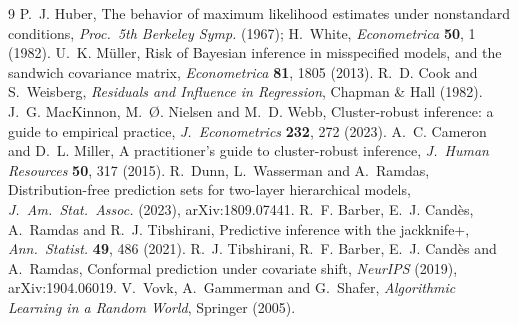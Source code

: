 \documentclass[11pt,a4paper]{article}
\begin{document}
\begin{thebibliography}{9}
 P.~J. Huber, The behavior of maximum likelihood estimates under nonstandard
conditions, \emph{Proc.\ 5th Berkeley Symp.} (1967); H.~White, \emph{Econometrica} \textbf{50}, 1 (1982).
 U.~K. M\"uller, Risk of Bayesian inference in misspecified models, and the sandwich
covariance matrix, \emph{Econometrica} \textbf{81}, 1805 (2013).
 R.~D. Cook and S.~Weisberg, \emph{Residuals and Influence in Regression}, Chapman \&
Hall (1982).
 J.~G. MacKinnon, M.~\O. Nielsen and M.~D. Webb, Cluster-robust inference: a
guide to empirical practice, \emph{J.\ Econometrics} \textbf{232}, 272 (2023).
 A.~C. Cameron and D.~L. Miller, A practitioner's guide to cluster-robust inference,
\emph{J.\ Human Resources} \textbf{50}, 317 (2015).
 R.~Dunn, L.~Wasserman and A.~Ramdas, Distribution-free prediction sets for two-layer
hierarchical models, \emph{J.\ Am.\ Stat.\ Assoc.} (2023), arXiv:1809.07441.
 R.~F. Barber, E.~J. Cand\`es, A.~Ramdas and R.~J. Tibshirani, Predictive inference
with the jackknife+, \emph{Ann.\ Statist.} \textbf{49}, 486 (2021).
 R.~J. Tibshirani, R.~F. Barber, E.~J. Cand\`es and A.~Ramdas, Conformal
prediction under covariate shift, \emph{NeurIPS} (2019), arXiv:1904.06019.
 V.~Vovk, A.~Gammerman and G.~Shafer, \emph{Algorithmic Learning in a Random World},
Springer (2005).
\end{thebibliography}
\end{document}

